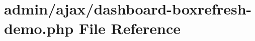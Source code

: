 \hypertarget{dashboard-boxrefresh-demo_8php}{\section{admin/ajax/dashboard-\/boxrefresh-\/demo.php File Reference}
\label{dashboard-boxrefresh-demo_8php}
}
